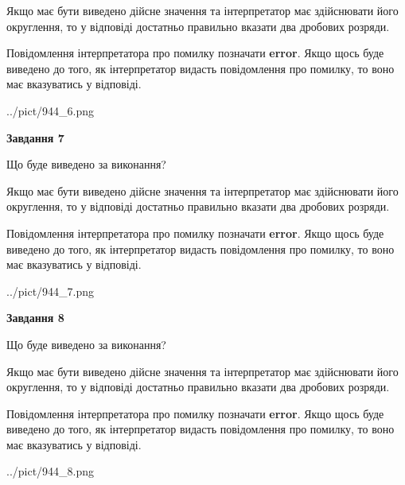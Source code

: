 \documentclass[12pt, ukrainian]{article}
\begin{document}
{\begin {Large}
Якщо має бути виведено дійсне значення та інтерпретатор має здійснювати його округлення, 
то у відповіді достатньо правильно вказати два дробових розряди.

Повідомлення інтерпретатора про помилку позначати \textbf{error}.
Якщо щось буде виведено до того, як інтерпретатор видасть повідомлення про помилку, 
то воно має вказуватись у відповіді. \par

\begin{center}
	{../pict/944_6.png}
\end{center}
\newpage

{\begin {center}\textbf{Завдання 7}\end {center}}\par
Що буде виведено за виконання? \par

Якщо має бути виведено дійсне значення та інтерпретатор має здійснювати його округлення, 
то у відповіді достатньо правильно вказати два дробових розряди.

Повідомлення інтерпретатора про помилку позначати \textbf{error}.
Якщо щось буде виведено до того, як інтерпретатор видасть повідомлення про помилку, 
то воно має вказуватись у відповіді. \par

\begin{center}
	{../pict/944_7.png}
\end{center}
\newpage

{\begin {center}\textbf{Завдання 8}\end {center}}\par
Що буде виведено за виконання? \par

Якщо має бути виведено дійсне значення та інтерпретатор має здійснювати його округлення, 
то у відповіді достатньо правильно вказати два дробових розряди.

Повідомлення інтерпретатора про помилку позначати \textbf{error}.
Якщо щось буде виведено до того, як інтерпретатор видасть повідомлення про помилку, 
то воно має вказуватись у відповіді. \par

\begin{center}
	{../pict/944_8.png}
\end{center}
\newpage


\end{Large}}
\end{document}

